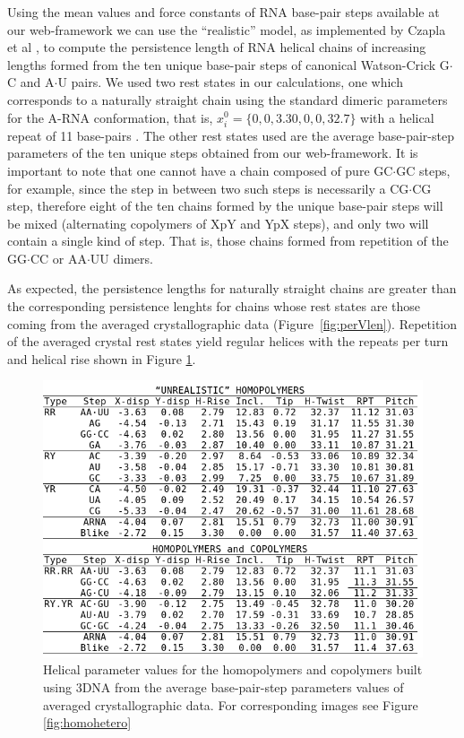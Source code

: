 Using  the mean  values and  force  constants of  RNA base-pair  steps
available at our web-framework we  can use the ``realistic'' model, as
implemented  by  Czapla  et   al  \cite{czapla2006},  to  compute  the
persistence length of RNA  helical chains of increasing lengths formed
from  the  ten  unique   base-pair  steps  of  canonical  Watson-Crick
G$\cdot$C  and  A$\cdot$U pairs.   We  used  two  rest states  in  our
calculations,  one which  corresponds  to a  naturally straight  chain
using the standard dimeric parameters for the A-RNA conformation, that
is, $x_{i}^{0} = \{0, 0, 3.30,  0, 0, 32.7\}$ with a helical repeat of
11  base-pairs \cite{chandrasekar1989,  arnott1999}.   The other  rest
states  used are  the  average base-pair-step  parameters  of the  ten
unique steps obtained from our  web-framework. It is important to note
that one cannot  have a chain composed of  pure GC$\cdot$GC steps, for
example, since  the step  in between two  such steps is  necessarily a
CG$\cdot$CG  step, therefore  eight of  the ten  chains formed  by the
unique base-pair  steps will be  mixed (alternating copolymers  of XpY
and YpX steps), and only two  will contain a single kind of step. That
is,  those  chains  formed  from  repetition  of  the  GG$\cdot$CC  or
AA$\cdot$UU dimers.

As expected, the persistence lengths for naturally straight chains are
greater than  the corresponding  persistence lenghts for  chains whose
rest states  are those coming from the  averaged crystallographic data
(Figure~\ref{fig:perVlen}).
Repetition of  the averaged crystal rest states  yield regular helices
with  the  repeats   per  turn  and  helical  rise   shown  in  Figure
\ref{fig:helicalprop}. 

\begin{figure}
\centering
\includegraphics[angle=0, scale=0.66]{Chapter4/helicalprop.png}
\caption{Helical parameter values  for the homopolymers and copolymers
  built using  3DNA from the average  base-pair-step parameters values
  of  averaged  crystallographic data.  For  corresponding images  see
  Figure \ref{fig:homohetero}}
\label{fig:helicalprop}
\end{figure}


